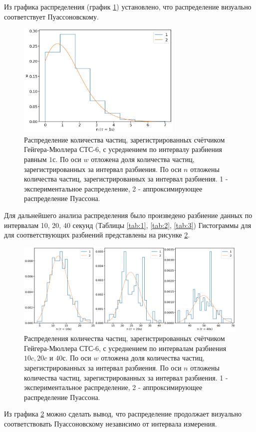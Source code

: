 \documentclass[12pt]{article}
\begin{document}
Из графика распределения (график \ref{fig:1}) установлено, что распределение визуально соответствует Пуассоновскому.
\begin{figure}[H]
    \begin{center}
        \includegraphics[width=0.7\textwidth]{gr1}
    \end{center}
    \caption{Распределение количества частиц, зарегистрированных счётчиком Гейгера-Мюллера СТС-6, с усреднением по интервалу разбиения
        равным $1$с. По оси $w$ отложена доля количества частиц, зарегистрированных за интервал разбиения. По оси $n$ отложены
        количества частиц, зарегистрированных за интервал разбиения. 1 - экспериментальное распределение, 2 - аппроксимирующее распределение Пуассона.}
    \label{fig:1}
\end{figure}
Для дальнейшего анализа распределения было произведено разбиение данных по интервалам 10, 20, 40 секунд (Таблицы \ref{tab:1}, \ref{tab:2}, \ref{tab:3})
Гистограммы для для соответствующих разбиений представлены на рисунке \ref{fig:2}.
\begin{figure}[H]
    \begin{center}
        \includegraphics[width=\textwidth]{gr2}
    \end{center}
    \caption{Распределения количества частиц, зарегистрированных счётчиком Гейгера-Мюллера СТС-6, с усреднением по интервалам разбиения
        $10c, 20c$ и $40$с. По оси $w$ отложена доля количества частиц, зарегистрированных за интервал разбиения. 
        По оси $n$ отложены количества частиц, зарегистрированных за интервал разбиения. 1 - экспериментальное распределение, 
        2 - аппроксимирующее распределение Пуассона.}
    \label{fig:2}
\end{figure}
Из графика \ref{fig:2} можно сделать вывод, что распределение продолжает визуально соответствовать Пуассоновскому 
независимо от интервала измерения.
\end{document}
